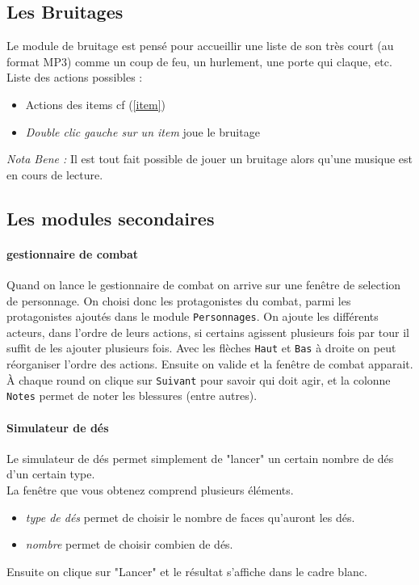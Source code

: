 \documentclass[a4paper,12pt]{article}
\newcommand*{\interfaceitem}[1]{\texttt{#1}}
\begin{document}
\subsection{Les Bruitages}\label{bruitage}
Le module de bruitage est pensé pour accueillir une liste de son très court (au format MP3) comme un coup de feu, un hurlement, une porte qui claque, etc.
\\
Liste des actions possibles :
\begin{itemize}
    \item Actions des items cf (\ref{item})
    \item \emph{Double clic gauche sur un item} joue le bruitage
\end{itemize}

\emph{Nota Bene :} Il est tout fait possible de jouer un bruitage alors qu'une musique est en cours de lecture.

\subsection{Les modules secondaires}
\paragraph{gestionnaire de combat}
Quand on lance le gestionnaire de combat on arrive sur une fenêtre de selection de personnage. On choisi donc les protagonistes du combat, parmi les protagonistes ajoutés dans le module \interfaceitem{Personnages}.
On ajoute les différents acteurs, dans l'ordre de leurs actions, si certains agissent plusieurs fois par tour il suffit de les ajouter plusieurs fois.
Avec les flèches \interfaceitem{Haut} et \interfaceitem{Bas} à droite on peut réorganiser l'ordre des actions.
Ensuite on valide et la fenêtre de combat apparait.
À chaque round on clique sur \interfaceitem{Suivant} pour savoir qui doit agir, et la colonne \interfaceitem{Notes} permet de noter les blessures (entre autres).

\paragraph{Simulateur de dés}
Le simulateur de dés permet simplement de "lancer" un certain nombre de dés d'un certain type.
\\
La fenêtre que vous obtenez comprend plusieurs éléments.
\begin{itemize}
  \item  \emph{type de dés} permet de choisir le nombre de faces qu'auront les dés.
  \item \emph{nombre} permet de choisir combien de dés.
\end{itemize}
Ensuite on clique sur "Lancer" et le résultat s'affiche dans le cadre blanc.
\end{document}
